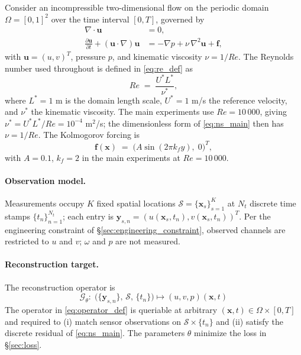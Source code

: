 Consider an incompressible two-dimensional flow on the periodic domain $\Omega = [0,1]^2$ over the time interval $[0, T]$, governed by
\begin{subequations}
\label{eq:ns_main}
\begin{align}
    \nabla \cdot \mathbf{u} &= 0, \label{eq:cont_main}\\
    \frac{\partial \mathbf{u}}{\partial t} + (\mathbf{u}\cdot\nabla)\mathbf{u}
        &= -\nabla p + \nu\,\nabla^2 \mathbf{u} + \mathbf{f}, \label{eq:mom_main}
\end{align}
\end{subequations}
with $\mathbf{u}=(u,v)^T$, pressure $p$, and kinematic viscosity $\nu = 1/Re$. The Reynolds number used throughout is defined in \eqref{eq:re_def} as
\begin{equation}
    \label{eq:re_def}
    Re \;=\; \frac{U^* L^*}{\nu^*},
\end{equation}
where $L^* = 1$ m is the domain length scale, $U^* = 1$ m/s the reference velocity, and $\nu^*$ the kinematic viscosity. The main experiments use $Re = 10\,000$, giving $\nu^* = U^* L^* / Re = 10^{-4}$ m$^2$/s; the dimensionless form of \eqref{eq:ns_main} then has $\nu = 1/Re$. The Kolmogorov forcing is
\begin{equation}
    \label{eq:forcing}
    \mathbf{f}(\mathbf{x}) \;=\; \big(A\sin(2\pi k_f y),\; 0\big)^T,
\end{equation}
with $A = 0.1$, $k_f = 2$ in the main experiments at $Re=10\,000$.

\paragraph{Observation model.}
Measurements occupy $K$ fixed spatial locations $\mathcal{S} = \{\mathbf{x}_s\}_{s=1}^K$ at $N_t$ discrete time stamps $\{t_n\}_{n=1}^{N_t}$; each entry is $\mathbf{y}_{s,n} = (u(\mathbf{x}_s, t_n), v(\mathbf{x}_s, t_n))^T$. Per the engineering constraint of \S\ref{sec:engineering_constraint}, observed channels are restricted to $u$ and $v$; $\omega$ and $p$ are not measured.

\paragraph{Reconstruction target.}
The reconstruction operator is
\begin{equation}
    \label{eq:operator_def}
    \mathcal{G}_\theta : \;\big(\{\mathbf{y}_{s,n}\},\,\mathcal{S},\,\{t_n\}\big) \longmapsto (u, v, p)(\mathbf{x}, t)
\end{equation}
The operator in \eqref{eq:operator_def} is queriable at arbitrary $(\mathbf{x}, t) \in \Omega\times[0,T]$ and required to (i) match sensor observations on $\mathcal{S}\times\{t_n\}$ and (ii) satisfy the discrete residual of \eqref{eq:ns_main}. The parameters $\theta$ minimize the loss in \S\ref{sec:loss}.

